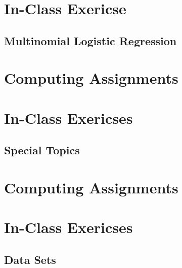 \documentclass[]{book}
\begin{document}
\part*{In-Class Exericse}\label{part-in-class-exericse}

\chapter{Multinomial Logistic Regression}\label{multinom-logistic}

\part*{Computing
Assignments}\label{part-computing-assignments-4}

\part*{In-Class Exericses}\label{part-in-class-exericses-2}

\chapter{Special Topics}\label{special}

\part*{Computing
Assignments}\label{part-computing-assignments-5}

\part*{In-Class Exericses}\label{part}

\chapter{Data Sets}\label{data}
\end{document}
